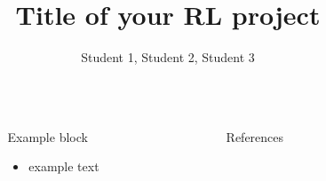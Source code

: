 \documentclass[final]{beamer}
\title{Title of your RL project}
\author{Student 1, Student 2, Student 3}
\newlength{\sepwidth}
\newlength{\colwidth}
\newcommand{\separatorcolumn}{\begin{column}{\sepwidth}\end{column}}
\begin{document}
\begin{frame}[t]
\begin{columns}[t]
\separatorcolumn

\begin{column}{\colwidth}

    \begin{block}{Example block}
    \begin{itemize}
        \item example text
    \end{itemize}
    
    \end{block}

\end{column}

\separatorcolumn
\begin{column}{\colwidth}

    
    \begin{block}{References}
        \nocite{*}
        \small{}
    \end{block}

\end{column}
\separatorcolumn

\end{columns}
\end{frame}
\end{document}
